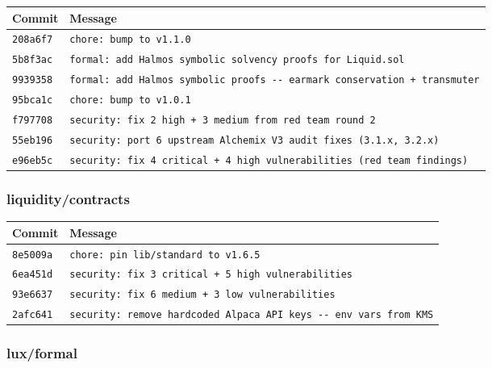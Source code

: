 \documentclass[
]{article}
\newcounter{none} %
\begin{document}
{\def\LTcaptype{none} %
\begin{longtable}[]{@{}ll@{}}
\toprule\noalign{}
Commit & Message \\
\midrule\noalign{}
\endhead
\bottomrule\noalign{}
\endlastfoot
\texttt{208a6f7} & \texttt{chore:\ bump\ to\ v1.1.0} \\
\texttt{5b8f3ac} &
\texttt{formal:\ add\ Halmos\ symbolic\ solvency\ proofs\ for\ Liquid.sol} \\
\texttt{9939358} &
\texttt{formal:\ add\ Halmos\ symbolic\ proofs\ -\/-\ earmark\ conservation\ +\ transmuter} \\
\texttt{95bca1c} & \texttt{chore:\ bump\ to\ v1.0.1} \\
\texttt{f797708} &
\texttt{security:\ fix\ 2\ high\ +\ 3\ medium\ from\ red\ team\ round\ 2} \\
\texttt{55eb196} &
\texttt{security:\ port\ 6\ upstream\ Alchemix\ V3\ audit\ fixes\ (3.1.x,\ 3.2.x)} \\
\texttt{e96eb5c} &
\texttt{security:\ fix\ 4\ critical\ +\ 4\ high\ vulnerabilities\ (red\ team\ findings)} \\
\end{longtable}
}

\subsubsection{liquidity/contracts}\label{liquiditycontracts}

{\def\LTcaptype{none} %
\begin{longtable}[]{@{}ll@{}}
\toprule\noalign{}
Commit & Message \\
\midrule\noalign{}
\endhead
\bottomrule\noalign{}
\endlastfoot
\texttt{8e5009a} & \texttt{chore:\ pin\ lib/standard\ to\ v1.6.5} \\
\texttt{6ea451d} &
\texttt{security:\ fix\ 3\ critical\ +\ 5\ high\ vulnerabilities} \\
\texttt{93e6637} &
\texttt{security:\ fix\ 6\ medium\ +\ 3\ low\ vulnerabilities} \\
\texttt{2afc641} &
\texttt{security:\ remove\ hardcoded\ Alpaca\ API\ keys\ -\/-\ env\ vars\ from\ KMS} \\
\end{longtable}
}

\subsubsection{lux/formal}\label{luxformal}
\end{document}
